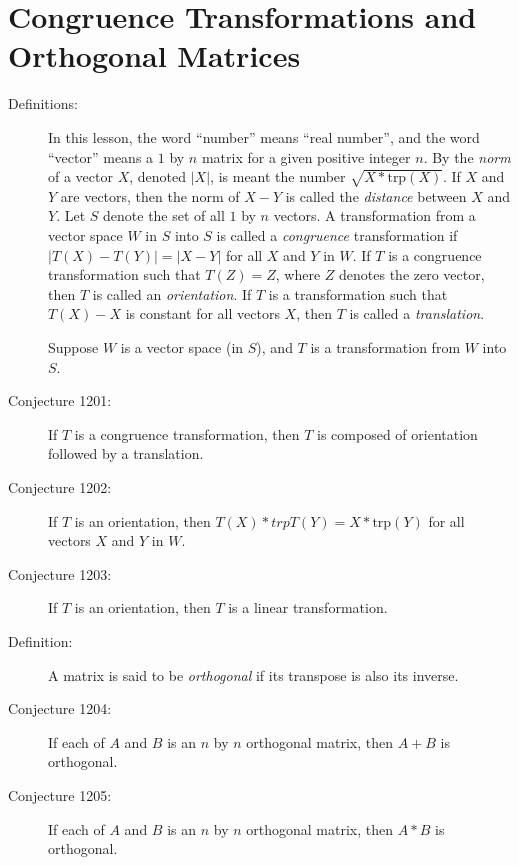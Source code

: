 \documentclass{article}
\begin{document}
\section{Congruence Transformations and Orthogonal Matrices}

\begin{description}

  \item[Definitions:] In this lesson, the word ``number'' means ``real number'', and the word ``vector'' means a $1$ by $n$ matrix for a given positive integer $n$. By the \emph{norm} of a vector $X$, denoted $\vert X \vert$, is meant the number $\sqrt{X*\text{trp}(X)}$. If $X$ and $Y$ are vectors, then the norm of $X-Y$ is called the \emph{distance} between $X$ and $Y$. Let $S$ denote the set of all $1$ by $n$ vectors. A transformation from a vector space $W$ in $S$ into $S$ is called a \emph{congruence} transformation if $\vert T(X)-T(Y) \vert = \vert X-Y \vert$ for all $X$ and $Y$ in $W$. If $T$ is a congruence transformation such that $T(Z)=Z$, where $Z$ denotes the zero vector, then $T$ is called an \emph{orientation}. If $T$ is a transformation such that $T(X)-X$ is constant for all vectors $X$, then $T$ is called a \emph{translation}.

  \item[] Suppose $W$ is a vector space (in $S$), and $T$ is a transformation from $W$ into $S$.

  \item[Conjecture 1201:] If $T$ is a congruence transformation, then $T$ is composed of orientation followed by a translation. 

  \item[Conjecture 1202:] If $T$ is an orientation, then $T(X)*trp T(Y)=X*\text{trp}(Y)$ for all vectors $X$ and $Y$ in $W$.

  \item[Conjecture 1203:] If $T$ is an orientation, then $T$ is a linear transformation.

  \item[Definition:] A matrix is said to be \emph{orthogonal} if its transpose is also its inverse.

  \item[Conjecture 1204:] If each of $A$ and $B$ is an $n$ by $n$ orthogonal matrix, then $A+B$ is orthogonal.

  \item[Conjecture 1205:] If each of $A$ and $B$ is an $n$ by $n$ orthogonal matrix, then $A*B$ is orthogonal.


\end{description}
\end{document}
